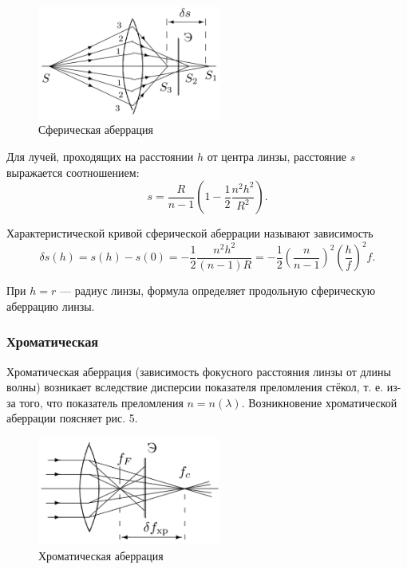 \documentclass[12pt,a4paper]{article}
\begin{document}
	\begin{figure}[h!]
		\centering
		\includegraphics[width=6cm]{res/sphere.png}
		\caption{Сферическая аберрация}
	\end{figure}

	Для лучей, проходящих на расстоянии $h$ от центра линзы, расстояние $s$ выражается соотношением:
	\begin{equation}
		s = \frac{R}{n - 1}\left(1 - \frac{1}{2} \frac{n^2 h^2}{R^2}\right).
	\end{equation}

	Характеристической кривой сферической аберрации называют зависимость 
	\begin{equation}
		\delta s(h) = s(h) - s(0) = -\frac{1}{2}\frac{n^2 h^2}{(n - 1)R} = -\frac{1}{2}\left(\frac{n}{n - 1}\right)^2 \left(\frac{h}{f}\right)^2 f.
        \label{eq:8}
	\end{equation}

	При $h = r$ — радиус линзы, формула определяет продольную сферическую аберрацию линзы.


	\subsubsection*{Хроматическая}
	Хроматическая аберрация (зависимость фокусного расстояния линзы от длины волны) возникает вследствие дисперсии показателя преломления стёкол, т. е. из-за того, что показатель преломления $n = n(\lambda)$. Возникновение хроматической аберрации поясняет рис. 5.

	\begin{figure}[h!]
		\centering
		\includegraphics[width=6cm]{res/chrome.png}
		\caption{Хроматическая аберрация}
	\end{figure}
\end{document}
